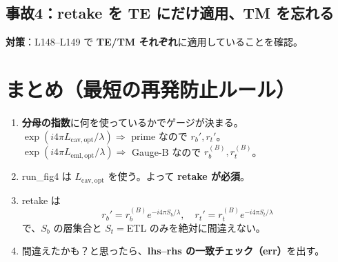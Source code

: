 \documentclass[a4paper,11pt]{article}
\begin{document}
\subsection*{事故4：retake を TE にだけ適用、TM を忘れる}
\textbf{対策}：L148--L149 で \textbf{TE/TM それぞれ}に適用していることを確認。

\section*{まとめ（最短の再発防止ルール）}
\begin{enumerate}
  \item \textbf{分母の指数}に何を使っているかでゲージが決まる。\\
  \(\exp(i4\pi L_{\mathrm{cav,opt}}/\lambda)\Rightarrow\) prime なので \(r_b',r_t'\)。\\
  \(\exp(i4\pi L_{\mathrm{eml,opt}}/\lambda)\Rightarrow\) Gauge-B なので \(r_b^{(B)},r_t^{(B)}\)。
  \item run\_fig4 は \(L_{\mathrm{cav,opt}}\) を使う。よって \textbf{retake が必須}。
  \item retake は
  \[
  r_b' = r_b^{(B)}e^{-i4\pi S_b/\lambda},\quad
  r_t' = r_t^{(B)}e^{-i4\pi S_t/\lambda}
  \]
  で、\(S_b\) の層集合と \(S_t=\)ETL のみを絶対に間違えない。
  \item 間違えたかも？と思ったら、\textbf{lhs--rhs の一致チェック（err）}を出す。
\end{enumerate}
\end{document}
